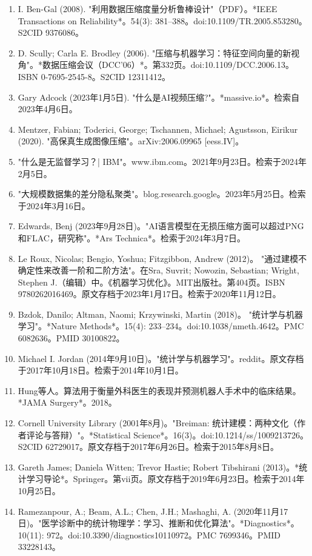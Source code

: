\begin{enumerate}
\item I. Ben-Gal (2008). "利用数据压缩度量分析鲁棒设计"（PDF）。*IEEE Transactions on Reliability*。54(3): 381–388。doi:10.1109/TR.2005.853280。S2CID 9376086。  
\item D. Scully; Carla E. Brodley (2006). "压缩与机器学习：特征空间向量的新视角"。*数据压缩会议（DCC'06）*。第332页。doi:10.1109/DCC.2006.13。ISBN 0-7695-2545-8。S2CID 12311412。  
\item Gary Adcock (2023年1月5日). "什么是AI视频压缩?"。*massive.io*。检索自2023年4月6日。  
\item Mentzer, Fabian; Toderici, George; Tschannen, Michael; Agustsson, Eirikur (2020). "高保真生成图像压缩"。arXiv:2006.09965 [eess.IV]。
\item "什么是无监督学习？| IBM"。www.ibm.com。2021年9月23日。检索于2024年2月5日。  
\item "大规模数据集的差分隐私聚类"。blog.research.google。2023年5月25日。检索于2024年3月16日。  
\item Edwards, Benj (2023年9月28日)。"AI语言模型在无损压缩方面可以超过PNG和FLAC，研究称"。*Ars Technica*。检索于2024年3月7日。  
\item Le Roux, Nicolas; Bengio, Yoshua; Fitzgibbon, Andrew (2012)。 "通过建模不确定性来改善一阶和二阶方法"。在Sra, Suvrit; Nowozin, Sebastian; Wright, Stephen J.（编辑）中。《机器学习优化》。MIT出版社。第404页。ISBN 9780262016469。原文存档于2023年1月17日。检索于2020年11月12日。  
\item Bzdok, Danilo; Altman, Naomi; Krzywinski, Martin (2018)。 "统计学与机器学习"。*Nature Methods*。15(4): 233–234。doi:10.1038/nmeth.4642。PMC 6082636。PMID 30100822。  
\item Michael I. Jordan (2014年9月10日)。"统计学与机器学习"。reddit。原文存档于2017年10月18日。检索于2014年10月1日。  
\item Hung等人。算法用于衡量外科医生的表现并预测机器人手术中的临床结果。*JAMA Surgery*。2018。  
\item Cornell University Library (2001年8月)。"Breiman: 统计建模：两种文化（作者评论与答辩）"。*Statistical Science*。16(3)。doi:10.1214/ss/1009213726。S2CID 62729017。原文存档于2017年6月26日。检索于2015年8月8日。  
\item Gareth James; Daniela Witten; Trevor Hastie; Robert Tibshirani (2013)。*统计学习导论*。Springer。第vii页。原文存档于2019年6月23日。检索于2014年10月25日。  
\item Ramezanpour, A.; Beam, A.L.; Chen, J.H.; Mashaghi, A. (2020年11月17日)。"医学诊断中的统计物理学：学习、推断和优化算法"。*Diagnostics*。10(11): 972。doi:10.3390/diagnostics10110972。PMC 7699346。PMID 33228143。


\end{enumerate}
